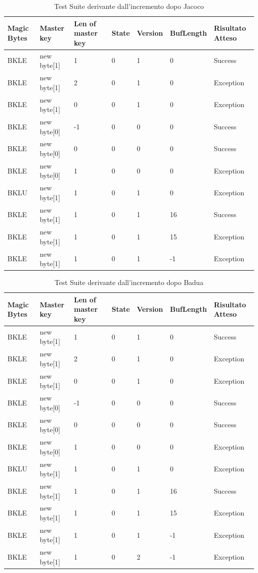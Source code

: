 \documentclass[12pt, a4paper]{article}
\begin{document}
\begin{table}[ht]
  \centering
  \caption[FileInfo: Test Suite - Adequacy Control Flow]{Test Suite derivante dall'incremento dopo Jacoco}
  \begin{tabular}{|l|l|l|l|l|l|l|}
    \hline
    \textbf{Magic Bytes} & \textbf{Master key} & \textbf{Len of master key}  & \textbf{State} & \textbf{Version} & \textbf{BufLength} & \textbf{Risultato Atteso} \\
    \hline
    BKLE & new byte[1] & 1 & 0 & 1 & 0 & Success \\
    BKLE & new byte[1] & 2 & 0 & 1 & 0 & Exception \\
    BKLE & new byte[1] & 0 & 0 & 1 & 0 & Exception \\
    BKLE & new byte[0] & -1 & 0 & 0 & 0 & Success \\
    BKLE & new byte[0] & 0 & 0 & 0 & 0 & Success \\
    BKLE & new byte[0] & 1 & 0 & 0 & 0 & Exception \\
    BKLU & new byte[1] & 1 & 0 & 1 & 0 & Exception \\
    BKLE & new byte[1] & 1 & 0 & 1 & 16 & Success \\
    BKLE & new byte[1] & 1 & 0 & 1 & 15 & Exception \\
    BKLE & new byte[1] & 1 & 0 & 1 & -1 & Exception \\
    \hline
  \end{tabular}
  \label{tab:TestSuiteReadHeader2}
\end{table}

\begin{table}[ht]
  \centering
  \caption[FileInfo: Test Suite - Adequacy Data Flow]{Test Suite derivante dall'incremento dopo Badua}
  \begin{tabular}{|l|l|l|l|l|l|l|}
    \hline
    \textbf{Magic Bytes} & \textbf{Master key} & \textbf{Len of master key}  & \textbf{State} & \textbf{Version} & \textbf{BufLength} & \textbf{Risultato Atteso} \\
    \hline
    BKLE & new byte[1] & 1 & 0 & 1 & 0 & Success \\
    BKLE & new byte[1] & 2 & 0 & 1 & 0 & Exception \\
    BKLE & new byte[1] & 0 & 0 & 1 & 0 & Exception \\
    BKLE & new byte[0] & -1 & 0 & 0 & 0 & Success \\
    BKLE & new byte[0] & 0 & 0 & 0 & 0 & Success \\
    BKLE & new byte[0] & 1 & 0 & 0 & 0 & Exception \\
    BKLU & new byte[1] & 1 & 0 & 1 & 0 & Exception \\
    BKLE & new byte[1] & 1 & 0 & 1 & 16 & Success \\
    BKLE & new byte[1] & 1 & 0 & 1 & 15 & Exception \\
    BKLE & new byte[1] & 1 & 0 & 1 & -1 & Exception \\
    BKLE & new byte[1] & 1 & 0 & 2 & -1 & Exception \\
    \hline
  \end{tabular}
  \label{tab:ADF1ReadHeader}
\end{table}
\end{document}
